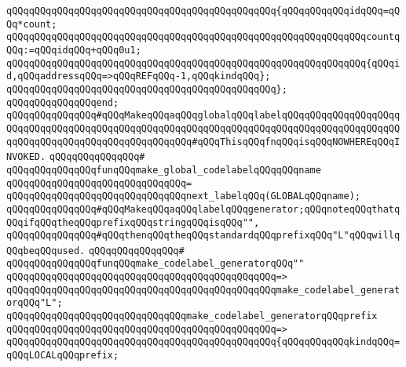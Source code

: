 \verb|qQQqqQQqqQQqqQQqqQQqqQQqqQQqqQQqqQQqqQQqqQQqqQQq{qQQqqQQqqQQqidqQQq=qQQq*count;|\newline
\verb|qQQqqQQqqQQqqQQqqQQqqQQqqQQqqQQqqQQqqQQqqQQqqQQqqQQqqQQqqQQqqQQqcountqQQq:=qQQqidqQQq+qQQq0u1;|\newline
\verb|qQQqqQQqqQQqqQQqqQQqqQQqqQQqqQQqqQQqqQQqqQQqqQQqqQQqqQQqqQQqqQQq{qQQqid,qQQqaddressqQQq=>qQQqREFqQQq-1,qQQqkindqQQq};|\newline
\verb|qQQqqQQqqQQqqQQqqQQqqQQqqQQqqQQqqQQqqQQqqQQqqQQq};|\newline
\verb|qQQqqQQqqQQqqQQqend;|\newline
\newline
\newline
\verb|qQQqqQQqqQQqqQQq#qQQqMakeqQQqaqQQqglobalqQQqlabelqQQqqQQqqQQqqQQqqQQqqQQqqQQqqQQqqQQqqQQqqQQqqQQqqQQqqQQqqQQqqQQqqQQqqQQqqQQqqQQqqQQqqQQqqQQqqQQqqQQqqQQqqQQqqQQqqQQqqQQqqQQq#qQQqThisqQQqfnqQQqisqQQqNOWHEREqQQqINVOKED.|\newline
\verb|qQQqqQQqqQQqqQQq#|\newline
\verb|qQQqqQQqqQQqqQQqfunqQQqmake_global_codelabelqQQqqQQqname|\newline
\verb|qQQqqQQqqQQqqQQqqQQqqQQqqQQqqQQq=|\newline
\verb|qQQqqQQqqQQqqQQqqQQqqQQqqQQqqQQqnext_labelqQQq(GLOBALqQQqname);|\newline
\newline
\newline
\newline
\verb|qQQqqQQqqQQqqQQq#qQQqMakeqQQqaqQQqlabelqQQqgenerator;qQQqnoteqQQqthatqQQqifqQQqtheqQQqprefixqQQqstringqQQqisqQQq"",|\newline
\verb|qQQqqQQqqQQqqQQq#qQQqthenqQQqtheqQQqstandardqQQqprefixqQQq"L"qQQqwillqQQqbeqQQqused.|\newline
\verb|qQQqqQQqqQQqqQQq#|\newline
\verb|qQQqqQQqqQQqqQQqfunqQQqmake_codelabel_generatorqQQq""|\newline
\verb|qQQqqQQqqQQqqQQqqQQqqQQqqQQqqQQqqQQqqQQqqQQqqQQq=>|\newline
\verb|qQQqqQQqqQQqqQQqqQQqqQQqqQQqqQQqqQQqqQQqqQQqqQQqmake_codelabel_generatorqQQq"L";|\newline
\newline
\verb|qQQqqQQqqQQqqQQqqQQqqQQqqQQqqQQqmake_codelabel_generatorqQQqprefix|\newline
\verb|qQQqqQQqqQQqqQQqqQQqqQQqqQQqqQQqqQQqqQQqqQQqqQQq=>|\newline
\verb|qQQqqQQqqQQqqQQqqQQqqQQqqQQqqQQqqQQqqQQqqQQqqQQq{qQQqqQQqqQQqkindqQQq=qQQqLOCALqQQqprefix;|\newline
